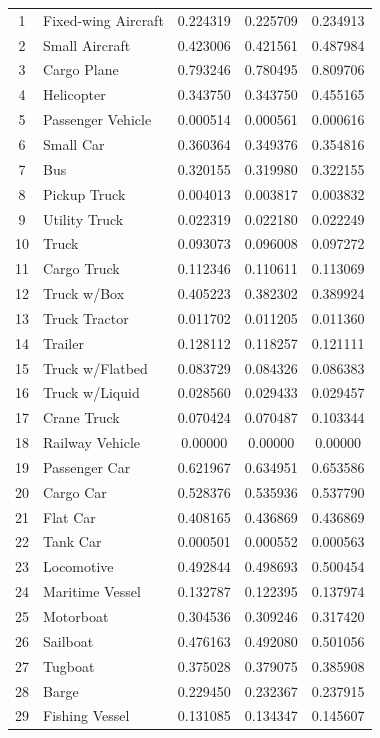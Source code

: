 \begin{center}
\begin{longtable}{|c|l|c|c|c|}
1 & Fixed-wing Aircraft & 0.224319 & 0.225709 & 0.234913\\
2 & Small Aircraft & 0.423006 & 0.421561 & 0.487984\\
3 & Cargo Plane & 0.793246 & 0.780495 & 0.809706\\
4 & Helicopter & 0.343750 & 0.343750 & 0.455165\\
5 & Passenger Vehicle & 0.000514 & 0.000561 & 0.000616\\
6 & Small Car & 0.360364 & 0.349376 & 0.354816\\
7 & Bus & 0.320155 & 0.319980 & 0.322155\\
8 & Pickup Truck & 0.004013 & 0.003817 & 0.003832\\
9 & Utility Truck & 0.022319 & 0.022180 & 0.022249\\
10 & Truck & 0.093073 & 0.096008 & 0.097272\\
11 & Cargo Truck & 0.112346 & 0.110611 & 0.113069\\
12 & Truck w/Box & 0.405223 & 0.382302 & 0.389924\\
13 & Truck Tractor & 0.011702 & 0.011205 & 0.011360\\
14 & Trailer & 0.128112 & 0.118257 & 0.121111\\
15 & Truck w/Flatbed & 0.083729 & 0.084326 & 0.086383\\
16 & Truck w/Liquid & 0.028560 & 0.029433 & 0.029457\\
17 & Crane Truck & 0.070424 & 0.070487 & 0.103344\\
18 & Railway Vehicle & 0.00000 & 0.00000 & 0.00000\\
19 & Passenger Car & 0.621967 & 0.634951 & 0.653586\\
20 & Cargo Car & 0.528376 & 0.535936 & 0.537790\\
21 & Flat Car & 0.408165 & 0.436869 & 0.436869\\
22 & Tank Car & 0.000501 & 0.000552 & 0.000563\\
23 & Locomotive & 0.492844 & 0.498693 & 0.500454\\
24 & Maritime Vessel & 0.132787 & 0.122395 & 0.137974\\
25 & Motorboat & 0.304536 & 0.309246 & 0.317420\\
26 & Sailboat & 0.476163 & 0.492080 & 0.501056\\
27 & Tugboat & 0.375028 & 0.379075 & 0.385908\\
28 & Barge & 0.229450 & 0.232367 & 0.237915\\
29 & Fishing Vessel & 0.131085 & 0.134347 & 0.145607\\

\end{longtable}
\end{center}

